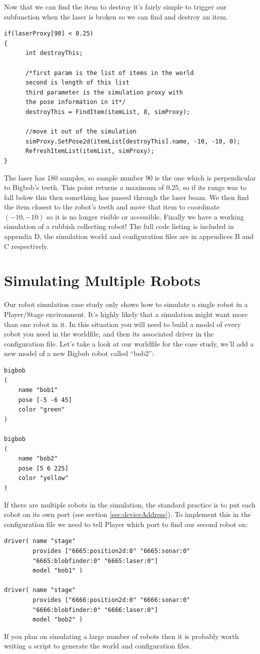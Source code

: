 \documentclass[a4paper]{report}
\newcommand{\plst}{Player/Stage\xspace}
\newcommand{\pl}{Player\xspace}
\begin{document}
Now that we can find the item to destroy it's fairly simple to trigger our subfunction when the laser is broken so we can find and destroy an item.
\begin{verbatim}
if(laserProxy[90] < 0.25)
{
      int destroyThis;

      /*first param is the list of items in the world
      second is length of this list
      third parameter is the simulation proxy with 
      the pose information in it*/
      destroyThis = FindItem(itemList, 8, simProxy);
 
      //move it out of the simulation
      simProxy.SetPose2d(itemList[destroyThis].name, -10, -10, 0);
      RefreshItemList(itemList, simProxy);
}
\end{verbatim}
The laser has 180 samples, so sample number 90 is the one which is perpendicular to Bigbob's teeth. This point returns a maximum of 0.25, so if its range was to fall below this then something has passed through the laser beam. We then find the item closest to the robot's teeth and move that item to coordinate $(-10, -10)$ so it is no longer visible or accessible.
\newline
Finally we have a working simulation of a rubbish collecting robot! The full code listing is included in appendix D, the simulation world and configuration files are in appendices B and C respectively.

\section{Simulating Multiple Robots}
Our robot simulation case study only shows how to simulate a single robot in a \plst environment. It's highly likely that a simulation might want more than one robot in it. In this situation you will need to build a model of every robot you need in the worldfile, and then its associated driver in the configuration file. Let's take a look at our worldfile for the case study, we'll add a new model of a new Bigbob robot called ``bob2'':
\begin{verbatim}
bigbob
(
	name "bob1"
	pose [-5 -6 45]
	color "green"
)

bigbob
(
	name "bob2"
	pose [5 6 225]
	color "yellow"
)
\end{verbatim}
If there are multiple robots in the simulation, the standard practice is to put each robot on its own port (see section \ref{sec:deviceAddress}). To implement this in the configuration file we need to tell \pl which port to find our second robot on:
\begin{verbatim}
driver( name "stage" 
        provides ["6665:position2d:0" "6665:sonar:0" 
        "6665:blobfinder:0" "6665:laser:0"] 
        model "bob1" )

driver( name "stage" 
        provides ["6666:position2d:0" "6666:sonar:0" 
        "6666:blobfinder:0" "6666:laser:0"] 
        model "bob2" )
\end{verbatim}
If you plan on simulating a large number of robots then it is probably worth writing a script to generate the world and configuration files.
\end{document}
